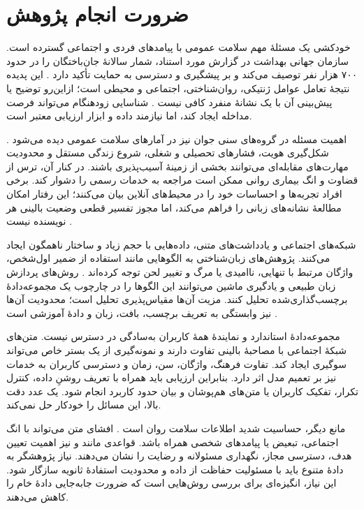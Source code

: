 \section{ضرورت انجام پژوهش}
خودکشی یک مسئلۀ مهم سلامت عمومی با پیامدهای فردی و اجتماعی گسترده است. سازمان جهانی بهداشت در گزارش مورد استناد، شمار سالانۀ جان‌باختگان را در حدود ۷۰۰ هزار نفر توصیف می‌کند و بر پیشگیری و دسترسی به حمایت تأکید دارد \cite{ref1}. این پدیده نتیجۀ تعامل عوامل ژنتیکی، روان‌شناختی، اجتماعی و محیطی است؛ ازاین‌رو توضیح یا پیش‌بینی آن با یک نشانۀ منفرد کافی نیست \cite{ref3}. شناسایی زودهنگام می‌تواند فرصت مداخله ایجاد کند، اما نیازمند داده و ابزار ارزیابی معتبر است.

اهمیت مسئله در گروه‌های سنی جوان نیز در آمارهای سلامت عمومی دیده می‌شود \cite{ref2,ref5}. شکل‌گیری هویت، فشارهای تحصیلی و شغلی، شروع زندگی مستقل و محدودیت مهارت‌های مقابله‌ای می‌توانند بخشی از زمینۀ آسیب‌پذیری باشند. در کنار آن، ترس از قضاوت و انگ بیماری روانی ممکن است مراجعه به خدمات رسمی را دشوار کند. برخی افراد تجربه‌ها و احساسات خود را در محیط‌های آنلاین بیان می‌کنند؛ این رفتار امکان مطالعۀ نشانه‌های زبانی را فراهم می‌کند، اما مجوز تفسیر قطعی وضعیت بالینی هر نویسنده نیست \cite{ref6,ref7}.

شبکه‌های اجتماعی و یادداشت‌های متنی، داده‌هایی با حجم زیاد و ساختار ناهمگون ایجاد می‌کنند. پژوهش‌های زبان‌شناختی به الگوهایی مانند استفاده از ضمیر اول‌شخص، واژگان مرتبط با تنهایی، ناامیدی یا مرگ و تغییر لحن توجه کرده‌اند \cite{ref8,ref9}. روش‌های پردازش زبان طبیعی و یادگیری ماشین می‌توانند این الگوها را در چارچوب یک مجموعه‌دادۀ برچسب‌گذاری‌شده تحلیل کنند. مزیت آن‌ها مقیاس‌پذیری تحلیل است؛ محدودیت آن‌ها نیز وابستگی به تعریف برچسب، بافت، زبان و دادۀ آموزشی است \cite{ref10}.

مجموعه‌دادۀ استاندارد و نمایندۀ همۀ کاربران به‌سادگی در دسترس نیست. متن‌های شبکۀ اجتماعی با مصاحبۀ بالینی تفاوت دارند و نمونه‌گیری از یک بستر خاص می‌تواند سوگیری ایجاد کند. تفاوت فرهنگ، واژگان، سن، زمان و دسترسی کاربران به خدمات نیز بر تعمیم مدل اثر دارد. بنابراین ارزیابی باید همراه با تعریف روشنِ داده، کنترل تکرار، تفکیک کاربران یا متن‌های هم‌پوشان و بیان حدود کاربرد انجام شود. یک عدد دقت بالا، این مسائل را خودکار حل نمی‌کند.

مانع دیگر، حساسیت شدید اطلاعات سلامت روان است \cite{ref4}. افشای متن می‌تواند با انگ اجتماعی، تبعیض یا پیامدهای شخصی همراه باشد. قواعدی مانند  و  نیز اهمیت تعیین هدف، دسترسی مجاز، نگهداری مسئولانه و رضایت را نشان می‌دهند. نیاز پژوهشگر به دادۀ متنوع باید با مسئولیت حفاظت از داده و محدودیت استفادۀ ثانویه سازگار شود. این نیاز، انگیزه‌ای برای بررسی روش‌هایی است که ضرورت جابه‌جایی دادۀ خام را کاهش می‌دهند.

